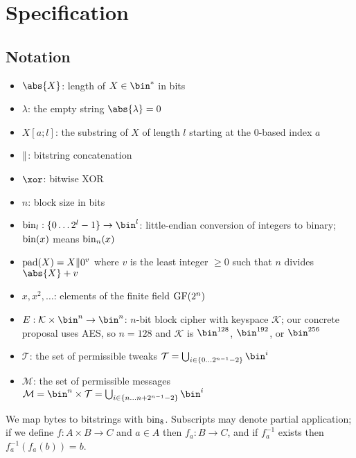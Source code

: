 \documentclass[hctr2.tex]{subfiles}
\begin{document}
\section{Specification}\label{specification}
\subsection{Notation}
\begin{itemize}
    \item $\abs{X}$: length of $X \in \bin^{*}$ in bits
    \item $\lambda$: the empty string $\abs{\lambda} = 0$
    \item $X[a;l]$: the substring of $X$ of length $l$ starting at the 0-based index $a$
    \item $\Vert$: bitstring concatenation
    \item \(\xor\): bitwise XOR
    \item \(n\): block size in bits
    \item $\fromint_l: \{0 \ldots 2^l-1\} \rightarrow \bin^l$:
    little-endian conversion of integers to binary; 
    \(\operatorname{bin}(x)\) means \(\operatorname{bin}_n(x)\)
    \item $\operatorname{pad}(X) = X \Vert 0^v$
    where $v$ is the least integer $\geq 0$ such that $n$ divides $\abs{X} + v$
    \item \(x, x^2, \ldots\): elements of the finite field \(\operatorname{GF}(2^n)\)
    \item \(E: \mathcal{K} \times \bin^n \rightarrow \bin^n\): 
    \(n\)-bit block cipher with keyspace \(\mathcal{K}\);
    our concrete proposal uses AES\cite{aes},
    so \(n=128\) and \(\mathcal{K}\) is
    \(\bin^{128}\), \(\bin^{192}\), or \(\bin^{256}\)
    \item \(\mathcal{T}\): the set of permissible tweaks
    \(\mathcal{T} = \bigcup_{i \in \{0\ldots2^{n-1}-2\}}\bin^i\)
    \item \(\mathcal{M}\): the set of permissible messages
    \(\mathcal{M} = \bin^n \times \mathcal{T} = \bigcup_{i \in \{n\ldots n + 2^{n-1}-2\}}\bin^i\)
\end{itemize}
We map bytes to bitstrings with \(\operatorname{bin}_8\). Subscripts may denote partial application; if we define $f: A \times B \rightarrow C$ and
$a \in A$ then $f_a: B \rightarrow C$, and if $f_a^{-1}$ exists then $f_a^{-1}(f_a(b)) = b$.
\end{document}
